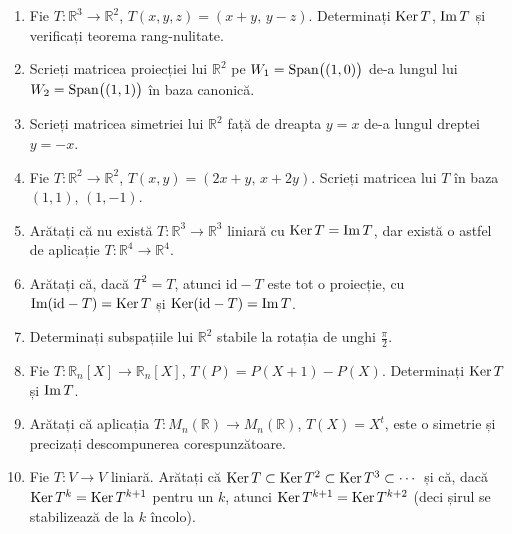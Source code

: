 \begin{enumerate}[label=\textbf{\arabic*.},leftmargin=*]
\item Fie $T:\mathbb{R}^3\to\mathbb{R}^2$, $T(x,y,z)=(x+y,\,y-z)$. Determinați $\operatorname{Ker} T$, $\operatorname{Im} T$ și verificați teorema rang-nulitate.
\item Scrieți matricea proiecției lui $\mathbb{R}^2$ pe $W_1=\operatorname{Span}\bigl((1,0)\bigr)$ de-a lungul lui $W_2=\operatorname{Span}\bigl((1,1)\bigr)$ în baza canonică.
\item Scrieți matricea simetriei lui $\mathbb{R}^2$ față de dreapta $y=x$ de-a lungul dreptei $y=-x$.
\item Fie $T:\mathbb{R}^2\to\mathbb{R}^2$, $T(x,y)=(2x+y,\,x+2y)$. Scrieți matricea lui $T$ în baza $(1,1)$, $(1,-1)$.
\item Arătați că nu există $T:\mathbb{R}^3\to\mathbb{R}^3$ liniară cu $\operatorname{Ker} T=\operatorname{Im} T$, dar există o astfel de aplicație $T:\mathbb{R}^4\to\mathbb{R}^4$.
\item Arătați că, dacă $T^2=T$, atunci $\mathrm{id}-T$ este tot o proiecție, cu $\operatorname{Im}(\mathrm{id}-T)=\operatorname{Ker} T$ și $\operatorname{Ker}(\mathrm{id}-T)=\operatorname{Im} T$.
\item Determinați subspațiile lui $\mathbb{R}^2$ stabile la rotația de unghi $\frac\pi2$.
\item Fie $T:\mathbb{R}_n[X]\to\mathbb{R}_n[X]$, $T(P)=P(X+1)-P(X)$. Determinați $\operatorname{Ker} T$ și $\operatorname{Im} T$.
\item Arătați că aplicația $T:M_n(\mathbb{R})\to M_n(\mathbb{R})$, $T(X)=X^t$, este o simetrie și precizați descompunerea corespunzătoare.
\item Fie $T:V\to V$ liniară. Arătați că $\operatorname{Ker} T\subset\operatorname{Ker} T^2\subset\operatorname{Ker} T^3\subset\cdots$ și că, dacă $\operatorname{Ker} T^k=\operatorname{Ker} T^{k+1}$ pentru un $k$, atunci $\operatorname{Ker} T^{k+1}=\operatorname{Ker} T^{k+2}$ (deci șirul se stabilizează de la $k$ încolo).
\end{enumerate}

